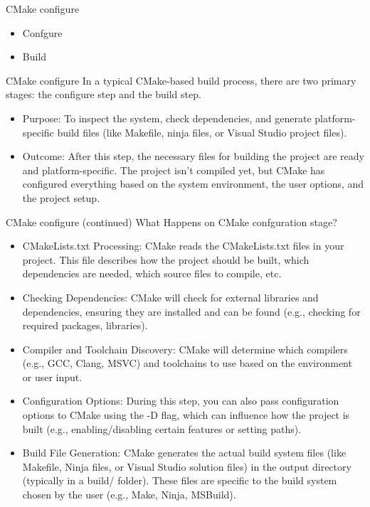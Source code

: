 \documentclass{beamer}
\begin{document}
\begin{frame}{CMake configure}
  \begin{itemize}
    \item Confgure
    \item Build
  \end{itemize}
\end{frame}

\begin{frame}{CMake configure}
  In a typical CMake-based build process, there are two primary stages: the configure step and the build step.
  \begin{itemize}
    \item Purpose: To inspect the system, check dependencies, and generate platform-specific build files (like Makefile, ninja files, or Visual Studio project files).
    \item Outcome: After this step, the necessary files for building the project are ready and platform-specific. The project isn't compiled yet, but CMake has configured everything based on the system environment, the user options, and the project setup.
  \end{itemize}
\end{frame}

\begin{frame}{CMake configure (continued)}
  \footnotesize
  What Happens on CMake confguration stage?
  \begin{itemize}
    \item CMakeLists.txt Processing: CMake reads the CMakeLists.txt files in your project. This file describes how the project should be built, which dependencies are needed, which source files to compile, etc.
    \item Checking Dependencies: CMake will check for external libraries and dependencies, ensuring they are installed and can be found (e.g., checking for required packages, libraries).
    \item Compiler and Toolchain Discovery: CMake will determine which compilers (e.g., GCC, Clang, MSVC) and toolchains to use based on the environment or user input.
    \item Configuration Options: During this step, you can also pass configuration options to CMake using the -D flag, which can influence how the project is built (e.g., enabling/disabling certain features or setting paths).
    \item Build File Generation: CMake generates the actual build system files (like Makefile, Ninja files, or Visual Studio solution files) in the output directory (typically in a build/ folder). These files are specific to the build system chosen by the user (e.g., Make, Ninja, MSBuild).
  \end{itemize}
\end{frame}
\end{document}
